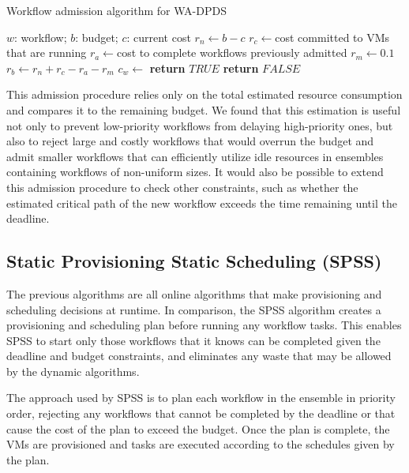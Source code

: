 \documentclass[conference]{IEEEtran}
\begin{document}
\begin{algorithm}[tb]
\caption{Workflow admission algorithm for WA-DPDS}
\label{alg:wa-dpds}
\begin{algorithmic}[1]
\Require $w$: workflow; $b$: budget; $c$: current cost
    \State $r_n\gets b-c$ 
    \State $r_c\gets $cost committed to VMs that are running
    \State $r_a\gets $cost to complete workflows previously admitted
  \State $r_m\gets 0.1$ 
  \State $r_b\gets r_n+r_c-r_a-r_m$ 
  \State $c_w\gets$ 
      \State \textbf{return} $TRUE$
    \Else
      \State \textbf{return} $FALSE$
  \EndIf       
\EndProcedure
\end{algorithmic} 
\end{algorithm}

This admission procedure relies only on the total estimated resource consumption and compares it to the remaining budget. We found that this estimation is useful not only to prevent low-priority workflows from delaying high-priority ones, but also to reject large and costly workflows that would overrun the budget and admit smaller workflows that can efficiently utilize idle resources in ensembles containing workflows of non-uniform sizes. It would also be possible to extend this admission procedure to check other constraints, such as whether the estimated critical path of the new workflow exceeds the time remaining until the deadline.


\subsection{Static Provisioning Static Scheduling (SPSS)}

The previous algorithms are all online algorithms that make provisioning and scheduling decisions at runtime. In comparison, the SPSS algorithm creates a provisioning and scheduling plan before running any workflow tasks. This enables SPSS to start only those workflows that it knows can be completed given the deadline and budget constraints, and eliminates any waste that may be allowed by the dynamic algorithms.

The approach used by SPSS is to plan each workflow in the ensemble in priority order, rejecting any workflows that cannot be completed by the deadline or that cause the cost of the plan to exceed the budget. Once the plan is complete, the VMs are provisioned and tasks are executed according to the schedules given by the plan.
\end{document}
